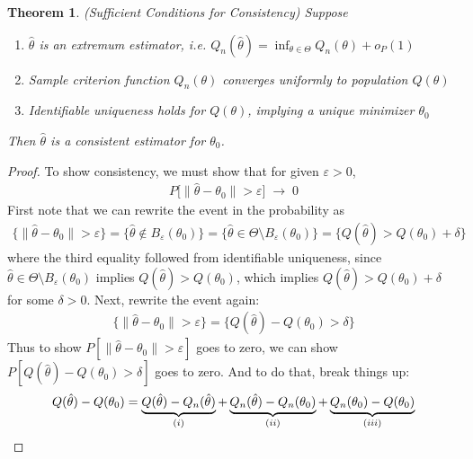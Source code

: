 \documentclass[12pt]{article}
\theoremstyle{plain}
\newtheorem{thm}{Theorem}[section]
\theoremstyle{definition}
\theoremstyle{remark}
\newcommand{\ra}{\rightarrow}
\begin{document}
\begin{thm}\emph{(Sufficient Conditions for Consistency)}
Suppose
\begin{enumerate}[label=\emph{(\roman*)}]
  \item $\hat{\theta}$ is an extremum estimator, i.e.
    $Q_n(\hat{\theta}) = \inf_{\theta\in \Theta} Q_n(\theta) + o_P(1)$
  \item Sample criterion function $Q_n(\theta)$ converges uniformly to
    population $Q(\theta)$
  \item Identifiable uniqueness holds for $Q(\theta)$,
    implying a unique minimizer $\theta_0$
\end{enumerate}
Then $\hat{\theta}$ is a consistent estimator for $\theta_0$.
\end{thm}

\clearpage
\begin{proof}
To show consistency, we must show that for given $\varepsilon>0$,
\begin{align*}
  P\big[
    \lVert\hat{\theta}-\theta_0\rVert
    > \varepsilon
  \big]
  \;\ra\;
  0
\end{align*}
First note that we can rewrite the event in the probability as
\begin{align*}
  \{
    \lVert\hat{\theta}-\theta_0\rVert
    > \varepsilon
  \}
  =
  \{
    \hat{\theta}\not\in B_\varepsilon(\theta_0)
  \}
  =
  \{
    \hat{\theta}\in \Theta\setminus B_\varepsilon(\theta_0)
  \}
  =
  \{
    Q(\hat{\theta})
    >
    Q(\theta_0)
    +
    \delta
  \}
\end{align*}
where the third equality followed from identifiable uniqueness, since
$\hat{\theta}\in\Theta\setminus B_\varepsilon(\theta_0)$ implies
$Q(\hat{\theta})>Q(\theta_0)$, which implies
$Q(\hat{\theta})>Q(\theta_0)+\delta$ for some $\delta>0$.
Next, rewrite the event again:
\begin{align*}
  \{
    \lVert\hat{\theta}-\theta_0\rVert
    > \varepsilon
  \}
  =
  \{
    Q(\hat{\theta})
    -
    Q(\theta_0)
    >
    \delta
  \}
\end{align*}
Thus to show $P[\lVert\hat{\theta}-\theta_0\rVert > \varepsilon]$ goes
to zero, we can show $P[Q(\hat{\theta})-Q(\theta_0)>\delta]$ goes to
zero. And to do that, break things up:
\begin{align*}
  Q(\hat{\theta})
  -
  Q(\theta_0)
  =
  \underbrace{%
    Q(\hat{\theta})
    - Q_n(\hat{\theta})
  }_{(i)}
  +
  \underbrace{%
    Q_n(\hat{\theta})
    - Q_n(\theta_0)
  }_{(ii)}
  +
  \underbrace{%
    Q_n(\theta_0)
    - Q(\theta_0)
  }_{(iii)}

\end{align*}
\end{proof}
\end{document}
